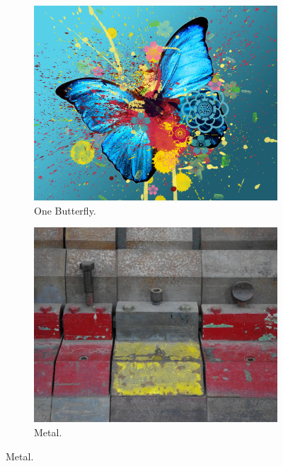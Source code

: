 \begin{figure}
  \begin{subfigure}{0.49\linewidth}    \includegraphics[width=\linewidth]{graphics/color3}   \caption{One Butterfly.}    \label{fig:scene_s_but}  \end{subfigure}
  \begin{subfigure}{0.49\linewidth}    \includegraphics[width=\linewidth]{graphics/lines1}   \caption{Metal.}            \label{fig:scene_metal}  \end{subfigure}

\end{figure}
